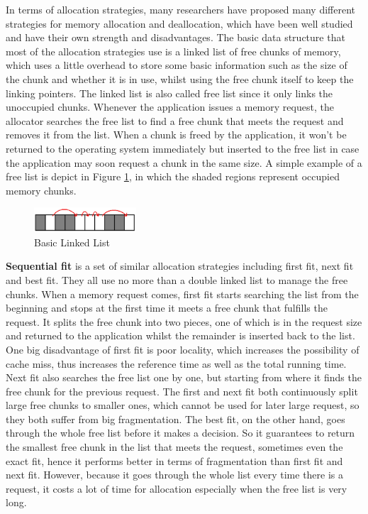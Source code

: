 \documentclass{acm_proc_article-sp}
\begin{document}
In terms of allocation strategies, many researchers have proposed many different strategies for memory allocation and deallocation, which have been well studied and have their own strength and disadvantages\cite{memoryallocatorreview1995}. The basic data structure that most of the allocation strategies use is a linked list of free chunks of memory, which uses a little overhead to store some basic information such as the size of the chunk and whether it is in use, whilst using the free chunk itself to keep the linking pointers. The linked list is also called free list since it only links the unoccupied chunks. Whenever the application issues a memory request, the allocator searches the free list to find a free chunk that meets the request and removes it from the list. When a chunk is freed by the application, it won't be returned to the operating system immediately but inserted to the free list in case the application may soon request a chunk in the same size. A simple example of a free list is depict in Figure \ref{fig_1}, in which the shaded regions represent occupied memory chunks.
\begin{figure}[htbp]
\centering
\includegraphics[width=1.5in]{fig1}
\caption{Basic Linked List}\label{fig_1}
\end{figure}

\textbf{Sequential fit} is a set of similar allocation strategies including first fit, next fit and best fit. They all use no more than a double linked list to manage the free chunks. When a memory request comes, first fit starts searching the list from the beginning and stops at the first time it meets a free chunk that fulfills the request. It splits the free chunk into two pieces, one of which is in the request size and returned to the application whilst the remainder is inserted back to the list. One big disadvantage of first fit is poor locality, which increases the possibility of cache miss, thus increases the reference time as well as the total running time. Next fit also searches the free list one by one, but starting from where it finds the free chunk for the previous request. The first and next fit both continuously split large free chunks to smaller ones, which cannot be used for later large request, so they both suffer from big fragmentation. The best fit, on the other hand, goes through the whole free list before it makes a decision. So it guarantees to return the smallest free chunk in the list that meets the request, sometimes even the exact fit, hence it performs better in terms of fragmentation than first fit and next fit\cite{Johnstone:1998:MFP:301589.286864}. However, because it goes through the whole list every time there is a request, it costs a lot of time for allocation especially when the free list is very long.
\end{document}
